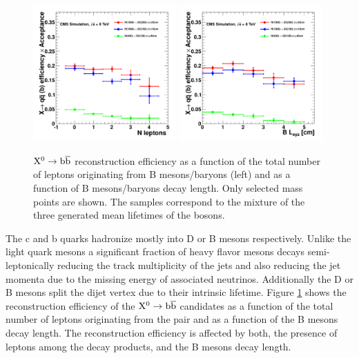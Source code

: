 \begin{figure}[htbp]
\centering
\includegraphics[width=0.49\textwidth]{plots/signal/effNLepb.pdf}
\includegraphics[width=0.49\textwidth]{plots/signal/effBlxyzb.pdf}
\caption{$\mathrm{X^{0}} \to \mathrm{b}\overline{\mathrm{b}}$ reconstruction efficiency as a function of the total number of leptons 
originating from B mesons/baryons (left) and as a function of B mesons/baryons decay length. Only selected 
mass points are shown. The samples correspond to the mixture of the three generated mean 
lifetimes of the \X bosons. \label{fig:effb}}
\end{figure}

The c and b quarks hadronize mostly into D or B mesons respectively.
 Unlike the light quark mesons a significant fraction of heavy flavor
mesons decays semi-leptonically reducing the track multiplicity of the jets and also reducing the jet momenta
 due to the missing energy of associated neutrinos. 
Additionally the D or B mesons split the dijet vertex due to their intrinsic lifetime.
Figure \ref{fig:effb} shows the reconstruction efficiency of the $\mathrm{X^{0}} \to \mathrm{b}\overline{\mathrm{b}}$ candidates as a function
of the total number of leptons originating from the \bbbar pair and as a function of the B mesons decay
length. The reconstruction efficiency is affected by both, the presence of leptons among
the decay products, and the
B mesons decay length.

